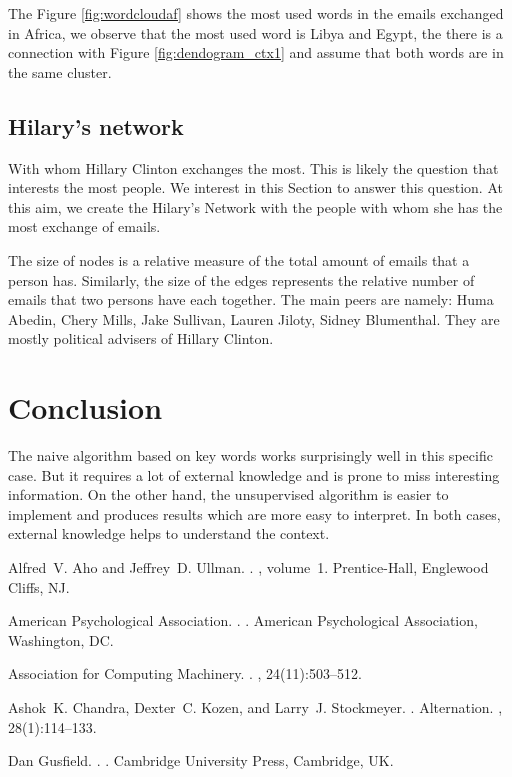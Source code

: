 \documentclass[11pt]{article}
\begin{document}
The Figure \ref{fig:wordcloudaf} shows the most used words in the emails exchanged in Africa, we observe that the most used word is Libya and Egypt, the there is a connection with Figure \ref{fig:dendogram_ctx1} and assume that both words are in the same cluster.
\subsection{Hilary's network}

With whom Hillary Clinton exchanges the most. This is likely the question that interests the most people. We interest in this Section to answer this question. At this aim, we create the Hilary's Network with the people with whom she has the most exchange of emails.

The size of nodes is a relative measure of the total amount of emails that a person has. Similarly, the size of the edges represents the relative number of emails that two persons have each together. The main peers are namely: Huma Abedin, Chery Mills, Jake Sullivan, Lauren Jiloty, Sidney Blumenthal. They are mostly political advisers of Hillary Clinton.

\section{Conclusion}

The naive algorithm based on key words works surprisingly well in this specific case. But it requires a lot of external knowledge and is prone to miss interesting information. On the other hand, the unsupervised algorithm is easier to implement and produces results which are more easy to interpret. In both cases, external knowledge helps to understand the context.

\begin{thebibliography}{}

Alfred~V. Aho and Jeffrey~D. Ullman.
.
, volume~1.
\newblock Prentice-{Hall}, Englewood Cliffs, NJ.

{American Psychological Association}.
.
.
\newblock American Psychological Association, Washington, DC.

{Association for Computing Machinery}.
.
, 24(11):503--512.

Ashok~K. Chandra, Dexter~C. Kozen, and Larry~J. Stockmeyer.
.
\newblock Alternation.
,
  28(1):114--133.

Dan Gusfield.
.
.
\newblock Cambridge University Press, Cambridge, UK.

\end{thebibliography}
\end{document}
